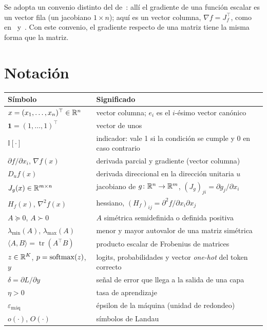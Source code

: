 \documentclass[11pt,a4paper,twoside,openany]{book}
\newcommand{\tr}{\operatorname{tr}}
\newcommand{\T}{^{\top}}
\newcommand{\uno}{\mathbf{1}}
\begin{document}
Se adopta un convenio distinto del de~\cite{mml}: allí el gradiente de una función escalar es un vector fila (un jacobiano $1\times n$); aquí es un vector columna, $\nabla f=J_f\T$, como en~\cite{bv} y~\cite{gbc}. Con este convenio, el gradiente respecto de una matriz tiene la misma forma que la matriz.

\section*{Notación}
\begin{center}
\begin{tabular}{@{}ll@{}}
\toprule
Símbolo & Significado \\
\midrule
$x=(x_1,\dots,x_n)\T\in\R^{n}$ & vector columna; $e_i$ es el $i$-ésimo vector canónico \\
$\uno=(1,\dots,1)\T$ & vector de unos \\
$\mathbb{I}[\cdot]$ & indicador: vale 1 si la condición se cumple y 0 en caso contrario \\
$\partial f/\partial x_i$, $\nabla f(x)$ & derivada parcial y gradiente (vector columna) \\
$D_u f(x)$ & derivada direccional en la dirección unitaria $u$ \\
$J_g(x)\in\mathbb{R}^{m\times n}$ & jacobiano de $g\colon\mathbb{R}^{n}\to\mathbb{R}^{m}$, $(J_g)_{ji}=\partial g_j/\partial x_i$ \\
$H_f(x)$, $\nabla^{2}f(x)$ & hessiano, $(H_f)_{ij}=\partial^{2}f/\partial x_i\partial x_j$ \\
$A\succeq 0$, $A\succ 0$ & $A$ simétrica semidefinida o definida positiva \\
$\lambda_{\min}(A)$, $\lambda_{\max}(A)$ & menor y mayor autovalor de una matriz simétrica \\
$\langle A,B\rangle=\tr(A\T B)$ & producto escalar de Frobenius de matrices \\
$z\in\mathbb{R}^{K}$, $p=\operatorname{softmax}(z)$, $y$ & logits, probabilidades y vector \emph{one-hot} del token correcto \\
$\delta=\partial L/\partial y$ & señal de error que llega a la salida de una capa \\
$\eta>0$ & tasa de aprendizaje \\
$\varepsilon_{\text{máq}}$ & épsilon de la máquina (unidad de redondeo) \\
$o(\cdot)$, $O(\cdot)$ & símbolos de Landau \\
\bottomrule
\end{tabular}
\end{center}

\tableofcontents
\flushbottom

\mainmatter







\appendix


\backmatter

\end{document}
